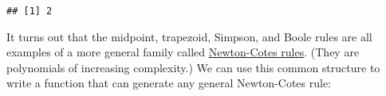 \begin{verbatim}
## [1] 2
\end{verbatim}

It turns out that the midpoint, trapezoid, Simpson, and Boole rules are
all examples of a more general family called
\href{http://en.wikipedia.org/wiki/Newton\%E2\%80\%93Cotes_formulas}{Newton-Cotes
rules}. (They are polynomials of increasing complexity.) We can use this
common structure to write a function that can generate any general
Newton-Cotes rule:

\begin{Shaded}
\begin{Highlighting}[]
\StringTok{ } \NormalTok{) \{}
\StringTok{ }\OperatorTok{+}\StringTok{ }

\StringTok{ }\OperatorTok{+}\StringTok{ }\OperatorTok{*}\StringTok{ }\OperatorTok{-}\StringTok{ }\OperatorTok{/}\StringTok{ }
\StringTok{ }\NormalTok{(}\NormalTok{(}\NormalTok{, }\OperatorTok{-}\StringTok{ }\NormalTok{))}

\OperatorTok{-}\StringTok{ }\OperatorTok{/}\StringTok{ }\OperatorTok{*}\StringTok{ }\NormalTok{(}\OperatorTok{*}\StringTok{ }
\NormalTok{  \}}
\NormalTok{\}}

\StringTok{ }\NormalTok{(}\NormalTok{(}\NormalTok{, }\NormalTok{, }\NormalTok{, }\NormalTok{, }\NormalTok{))}
\StringTok{ }\NormalTok{(}\NormalTok{(}\NormalTok{, }\NormalTok{, }\NormalTok{), } \NormalTok{)}
 \NormalTok{, }
\end{Highlighting}
\end{Shaded}

